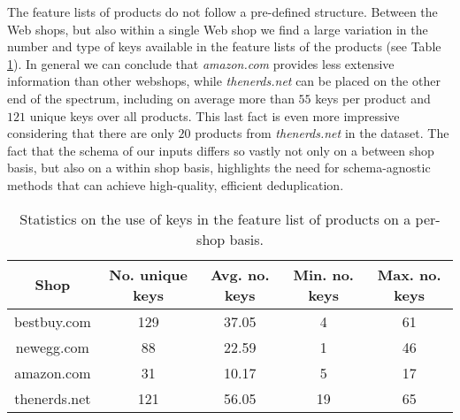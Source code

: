 The feature lists of products do not follow a pre-defined structure. Between the Web shops, but also within a single Web shop we find a large variation in the number and type of keys available in the feature lists of the products (see Table \ref{table:keys}). In general we can conclude that \textit{amazon.com} provides less extensive information than other webshops, while \textit{thenerds.net} can be placed on the other end of the spectrum, including on average more than $55$ keys per product and $121$ unique keys over all products. This last fact is even more impressive considering that there are only $20$ products from \textit{thenerds.net} in the dataset. The fact that the schema of our inputs differs so vastly not only on a between shop basis, but also on a within shop basis, highlights the need for schema-agnostic methods that can achieve high-quality, efficient deduplication.
\begin{table}
    \centering
    \caption{Statistics on the use of keys in the feature list of products on a per-shop basis.}
    \begin{tabular}{ |c|c|c|c|c| } 
     \hline
     Shop & No. unique keys & Avg. no. keys & Min. no. keys & Max. no. keys \\ 
     \hline
     bestbuy.com & 129 & 37.05 &  4 & 61 \\
     \hline
     newegg.com & 88 & 22.59 & 1 & 46  \\ 
     \hline
     amazon.com & 31 & 10.17 & 5 & 17  \\ 
     \hline
     thenerds.net & 121 & 56.05 & 19 & 65    \\ 
     \hline
    \end{tabular}
    \label{table:keys}
\end{table}

